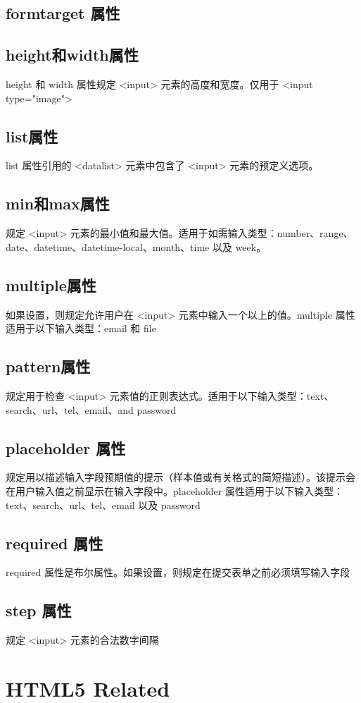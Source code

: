 \documentclass[10pt,UTF8]{ctexart}
\begin{document}
\subsection{formtarget 属性}
\subsection{height和width属性}
height 和 width 属性规定 <input> 元素的高度和宽度。仅用于 <input type="image">
\subsection{list属性}
list 属性引用的 <datalist> 元素中包含了 <input> 元素的预定义选项。
\subsection{min和max属性}
规定 <input> 元素的最小值和最大值。适用于如需输入类型：number、range、date、datetime、datetime-local、month、time 以及 week。
\subsection{multiple属性}
如果设置，则规定允许用户在 <input> 元素中输入一个以上的值。multiple 属性适用于以下输入类型：email 和 file
\subsection{pattern属性}
规定用于检查 <input> 元素值的正则表达式。适用于以下输入类型：text、search、url、tel、email、and password
\subsection{placeholder 属性}
规定用以描述输入字段预期值的提示（样本值或有关格式的简短描述）。该提示会在用户输入值之前显示在输入字段中。placeholder 属性适用于以下输入类型：text、search、url、tel、email 以及 password
\subsection{required 属性}
required 属性是布尔属性。如果设置，则规定在提交表单之前必须填写输入字段
\subsection{step 属性}
规定 <input> 元素的合法数字间隔

\section{HTML5 Related}
\end{document}
